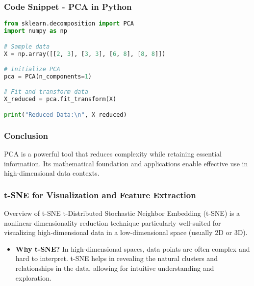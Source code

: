 \documentclass[aspectratio=169]{beamer}
\begin{document}
\begin{frame}[fragile]
    \frametitle{Code Snippet - PCA in Python}
    
    \begin{lstlisting}[language=Python]
from sklearn.decomposition import PCA
import numpy as np

# Sample data
X = np.array([[2, 3], [3, 3], [6, 8], [8, 8]])

# Initialize PCA
pca = PCA(n_components=1)

# Fit and transform data
X_reduced = pca.fit_transform(X)

print("Reduced Data:\n", X_reduced)
    \end{lstlisting}
\end{frame}

\begin{frame}[fragile]
    \frametitle{Conclusion}
    
    PCA is a powerful tool that reduces complexity while retaining essential information. Its mathematical foundation and applications enable effective use in high-dimensional data contexts.
\end{frame}

\begin{frame}[fragile]
    \frametitle{t-SNE for Visualization and Feature Extraction}
    \begin{block}{Overview of t-SNE}
        t-Distributed Stochastic Neighbor Embedding (t-SNE) is a nonlinear dimensionality reduction technique particularly well-suited for visualizing high-dimensional data in a low-dimensional space (usually 2D or 3D).
    \end{block}
    \begin{itemize}
        \item \textbf{Why t-SNE?} 
        In high-dimensional spaces, data points are often complex and hard to interpret. t-SNE helps in revealing the natural clusters and relationships in the data, allowing for intuitive understanding and exploration.
    \end{itemize}
\end{frame}
\end{document}
